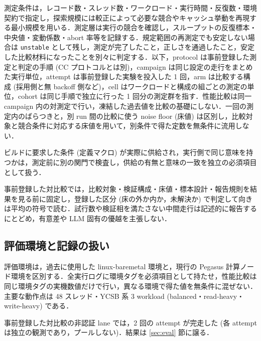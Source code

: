\documentclass[submit,techrep,noauthor]{ipsj}
\begin{document}
測定条件は，レコード数・スレッド数・ワークロード・実行時間・反復数・環境契約で指定し，探索規模には較正によって必要な競合やキャッシュ挙動を再現する最小規模を用いる．測定層は実行の競合を確認し，スループットの反復標本・中央値・変動係数・abort 率等を記録する．規定範囲の再測定でも安定しない場合は \texttt{unstable} として残し，測定が完了したこと，正しさを通過したこと，安定した比較材料になったことを別々に判定する．以下，protocol は事前登録した測定と判定の手順 (CC プロトコルとは別)，campaign は同じ設定の走行をまとめた実行単位，attempt は事前登録した実験を投入した 1 回，arm は比較する構成 (採用側と無 backoff 側など)，cell はワークロードと構成の組ごとの測定の単位，cohort は同じ手順で独立に行った 1 回分の測定群を指す．性能比較は同一 campaign 内の対測定で行い，凍結した過去値を比較の基礎にしない．一回の測定内のばらつきと，別 run 間の比較に使う noise floor (床値) は区別し，比較対象と競合条件に対応する床値を用いて，別条件で得た定数を無条件に流用しない．

ビルドに要求した条件 (定義マクロ) が実際に供給され，実行側で同じ意味を持つかは，測定前に別の関門で検査し，供給の有無と意味の一致を独立の必須項目として扱う．

事前登録した対比較では，比較対象・検証構成・床値・標本設計・報告規則を結果を見る前に固定し，登録した区分 (床の外か内か，未解決か) で判定して向きは平均の符号で読む．試行数や検証相を満たさない中間走行は記述的に報告するにとどめ，有意差や LLM 固有の優越を主張しない．

\subsection{評価環境と記録の扱い}
\label{sec:design-env}

評価環境は，過去に使用した linux-baremetal 環境と，現行の Pegasus 計算ノード環境を区別する．全実行ログに環境タグを必須項目として持たせ，性能比較は同じ環境タグの実機数値だけで行い，異なる環境で得た値を無条件に混ぜない．主要な動作点は 48 スレッド・YCSB 系 3 workload (balanced・read-heavy・write-heavy) である．

事前登録した対比較の非認証 lane では，2 回の attempt が完走した (各 attempt は独立の観測であり，プールしない)．結果は \ref{sec:eval} 節に譲る．
\end{document}
